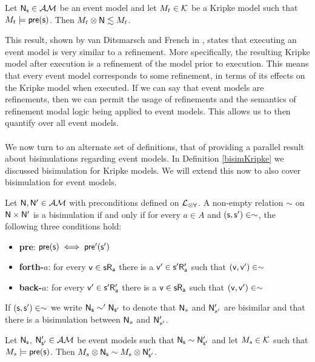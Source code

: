\begin{lemma} \label{eventModelsRefine}
Let $\mathrm{\mathsf{\mathrm{\mathsf{N}}_s}} \in \mathcal{AM}$ be an event model and let $M_t \in \mathcal{K}$ be a Kripke
model such that $M_t \models \mathrm{\mathsf{pre(s)}}$.
Then $M_t \otimes \mathrm{\mathsf{\mathrm{\mathsf{N}}}} \lesssim M_t$.
\end{lemma}

This result, shown by van Ditsmarsch and French in \cite{van2009simulation}, states that executing
an event model is very similar to a refinement.
More specifically, the resulting Kripke model after execution is a refinement of the model prior to
execution.
This means that every event model corresponds to some refinement, in terms of its effects on the
Kripke model when executed.
If we can say that event models are refinements, then we can permit the usage of refinements and the
semantics of refinement modal logic being applied to event models.
This allows us to then quantify over all event models.\\
\\
We now turn to an alternate set of definitions, that of providing a parallel result about bisimulations regarding event models.
In Definition \ref{bisimKripke} we discussed bisimulation for Kripke models.
We will extend this now to also cover bisimulation for event models.

\begin{defn} \label{bisimEvent}
	Let $\mathrm{\mathsf{\mathrm{\mathsf{N}}, \mathrm{\mathsf{N}}'}} \in \mathcal{AM}$ with preconditions defined on $\mathcal{L}_{\otimes\forall}$.
	A non-empty relation $\sim$ on $\mathrm{\mathsf{\mathrm{\mathsf{N}}}} \times \mathrm{\mathsf{\mathrm{\mathsf{N}}'}}$ is a bisimulation if and only if for every $a \in A$
	and $\mathrm{\mathsf{(s, s') \in \sim}}$, the following three conditions hold:
	\begin{itemize}
		\item {\bf pre}: $\mathrm{\mathsf{pre(s)}} \iff \mathrm{\mathsf{pre'(s')}}$
		\item {\bf forth-$a$}: for every $\mathrm{\mathsf{v \in s R_a}}$ there is a $\mathrm{\mathsf{v'
      \in s' R'_a}}$ such that $\mathrm{\mathsf{(v,v')}} \in \sim$
		\item {\bf back-$a$}: for every $\mathrm{\mathsf{v' \in s' R'_a}}$ there is a $\mathrm{\mathsf{v
      \in s R_a}}$ such that $\mathrm{\mathsf{(v,v')}} \in
		\sim$
	\end{itemize}
	If $\mathrm{\mathsf{(s, s') \in \sim}}$ we write $\mathrm{\mathsf{\mathrm{\mathsf{N}}_s \sim '\mathrm{\mathsf{N}}_{s'}}}$ to
  denote that $\mathrm{\mathsf{N}}_s$ and $\mathrm{\mathsf{N}}'_{s'}$ are bisimilar and
	that there is a bisimulation between $\mathrm{\mathsf{N}}_s$ and $\mathrm{\mathsf{N}}'_{s'}$.
\end{defn}

\begin{lemma} \label{eventModelEquivalent}
Let $\mathrm{\mathsf{\mathrm{\mathsf{N}}_s}}$, $\mathrm{\mathsf{\mathrm{\mathsf{N}}'_{s'}}} \in \mathcal{AM}$ be event models such that $\mathrm{\mathsf{\mathrm{\mathsf{N}}_s}}
\sim \mathrm{\mathsf{\mathrm{\mathsf{N}}'_{s'}}}$
and let $M_s \in \mathcal{K}$ such that $M_s \models \mathrm{\mathsf{pre(s)}}$.
Then $M_s \otimes \mathrm{\mathsf{\mathrm{\mathsf{N}}_s}} \sim M_s \otimes \mathrm{\mathsf{\mathrm{\mathsf{N}}'_{s'}}}$.
\end{lemma}

